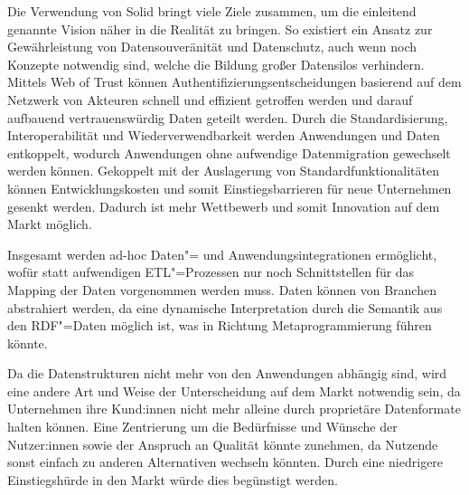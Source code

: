 
Die Verwendung von Solid bringt viele Ziele zusammen, um die einleitend genannte Vision näher in die Realität zu bringen.
So existiert ein Ansatz zur Gewährleistung von Datensouveränität und Datenschutz, auch wenn noch Konzepte notwendig sind, welche die Bildung großer Datensilos verhindern.
Mittels Web of Trust können Authentifizierungsentscheidungen basierend auf dem Netzwerk von Akteuren schnell und effizient getroffen werden und darauf aufbauend vertrauenswürdig Daten geteilt werden.
Durch die Standardisierung, Interoperabilität und Wiederverwendbarkeit werden Anwendungen und Daten entkoppelt, wodurch Anwendungen ohne aufwendige Datenmigration gewechselt werden können.
Gekoppelt mit der Auslagerung von Standardfunktionalitäten können Entwicklungskosten und somit Einstiegsbarrieren für neue Unternehmen gesenkt werden.
Dadurch ist mehr Wettbewerb und somit Innovation auf dem Markt möglich.

Insgesamt werden ad-hoc Daten"= und Anwendungsintegrationen ermöglicht, wofür statt aufwendigen ETL"=Prozessen nur noch Schnittstellen für das Mapping der Daten vorgenommen werden muss.
Daten können von Branchen abstrahiert werden, da eine dynamische Interpretation durch die Semantik aus den RDF"=Daten möglich ist, was in Richtung Metaprogrammierung führen könnte.

Da die Datenstrukturen nicht mehr von den Anwendungen abhängig sind, wird eine andere Art und Weise der Unterscheidung auf dem Markt notwendig sein, da Unternehmen ihre Kund:innen nicht mehr alleine durch proprietäre Datenformate halten können.
Eine Zentrierung um die Bedürfnisse und Wünsche der Nutzer:innen sowie der Anspruch an Qualität könnte zunehmen, da Nutzende sonst einfach zu anderen Alternativen wechseln könnten.
Durch eine niedrigere Einstiegshürde in den Markt würde dies begünstigt werden.
